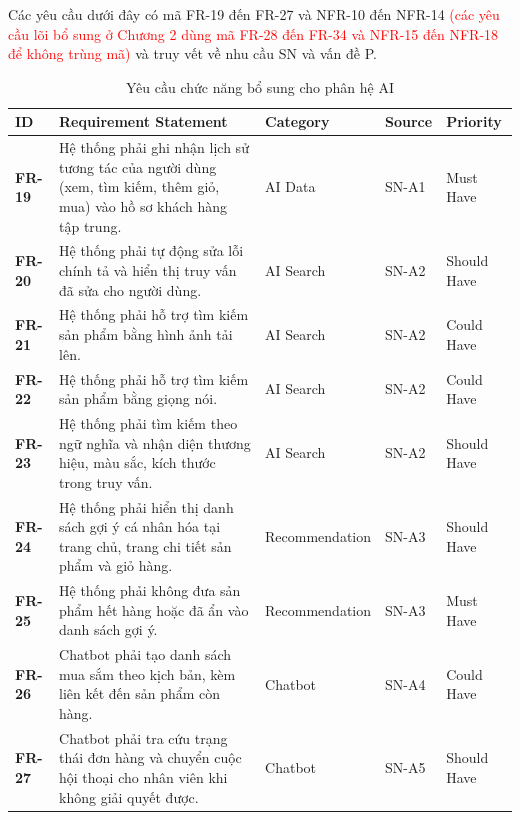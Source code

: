 \documentclass[12pt,a4paper,oneside]{report}
\newif\ifmark \marktrue
\newcommand{\chg}[1]{\ifmark\textcolor{red}{#1}\else #1\fi}
\begin{document}
Các yêu cầu dưới đây có mã FR-19 đến FR-27 và NFR-10 đến NFR-14 \chg{(các yêu cầu lõi bổ sung ở Chương 2 dùng mã FR-28 đến FR-34 và NFR-15 đến NFR-18 để không trùng mã)} và truy vết về nhu cầu SN và vấn đề P.

\begin{longtable}{p{1.6cm}p{7.6cm}p{2.8cm}p{1.8cm}p{2.2cm}}
\caption{Yêu cầu chức năng bổ sung cho phân hệ AI}\\
\toprule
\textbf{ID} & \textbf{Requirement Statement} & \textbf{Category} & \textbf{Source} & \textbf{Priority} \\
\midrule
\endhead
\bottomrule
\endlastfoot
\textbf{FR-19} & Hệ thống phải ghi nhận lịch sử tương tác của người dùng (xem, tìm kiếm, thêm giỏ, mua) vào hồ sơ khách hàng tập trung. & AI Data & SN-A1 & Must Have \\
\textbf{FR-20} & Hệ thống phải tự động sửa lỗi chính tả và hiển thị truy vấn đã sửa cho người dùng. & AI Search & SN-A2 & Should Have \\
\textbf{FR-21} & Hệ thống phải hỗ trợ tìm kiếm sản phẩm bằng hình ảnh tải lên. & AI Search & SN-A2 & Could Have \\
\textbf{FR-22} & Hệ thống phải hỗ trợ tìm kiếm sản phẩm bằng giọng nói. & AI Search & SN-A2 & Could Have \\
\textbf{FR-23} & Hệ thống phải tìm kiếm theo ngữ nghĩa và nhận diện thương hiệu, màu sắc, kích thước trong truy vấn. & AI Search & SN-A2 & Should Have \\
\textbf{FR-24} & Hệ thống phải hiển thị danh sách gợi ý cá nhân hóa tại trang chủ, trang chi tiết sản phẩm và giỏ hàng. & Recommendation & SN-A3 & Should Have \\
\textbf{FR-25} & Hệ thống phải không đưa sản phẩm hết hàng hoặc đã ẩn vào danh sách gợi ý. & Recommendation & SN-A3 & Must Have \\
\textbf{FR-26} & Chatbot phải tạo danh sách mua sắm theo kịch bản, kèm liên kết đến sản phẩm còn hàng. & Chatbot & SN-A4 & Could Have \\
\textbf{FR-27} & Chatbot phải tra cứu trạng thái đơn hàng và chuyển cuộc hội thoại cho nhân viên khi không giải quyết được. & Chatbot & SN-A5 & Should Have \\
\end{longtable}
\end{document}
